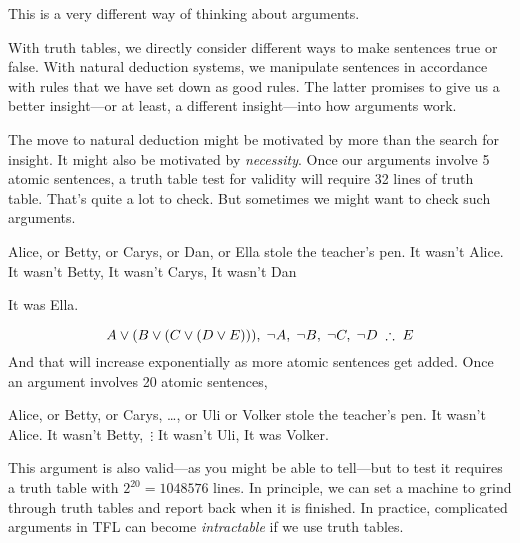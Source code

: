 {This is a very different way of thinking about arguments.}

With truth tables, we directly consider different ways to make sentences true or false. With natural deduction systems, we manipulate sentences in accordance with rules that we have set down as good rules. The latter promises to give us a better insight---or at least, a different insight---into how arguments work.

The move to natural deduction might be motivated by more than the search for insight. It might also be motivated by \emph{necessity}. Once our arguments involve 5 atomic sentences,  a truth table test for validity will require 32 lines of truth table. That's quite a lot to check. But sometimes we might want to check such arguments.
\begin{center}
\begin{earg}
\prem Alice, or Betty, or Carys, or Dan, or Ella stole the teacher's pen.
\prem It wasn't Alice.
\prem It wasn't Betty,
\prem It wasn't Carys,
\prem It wasn't Dan
\item [\therefore] It was Ella.
\end{earg}
\end{center}
$$A\eor(B\eor (C\eor (D\eor E))),\;\enot A,\;\enot B,\;\enot C,\;\enot D\;\therefore\;E$$
And that will increase exponentially as more atomic sentences get added. Once an argument involves 20 atomic sentences,
\begin{center}
\begin{earg}
\prem Alice, or Betty, or Carys, \ldots, or Uli or Volker stole the teacher's pen.
\prem It wasn't Alice.
\prem It wasn't Betty,
\prem\,$\vdots$
\prem It wasn't Uli,
\conc It was Volker.
\end{earg}
\end{center}
This argument is also valid---as you might be able to tell---but to test it requires a truth table with $2^{20} = 1048576$ lines. In principle, we can set a machine to grind through truth tables and report back when it is finished. In practice, complicated arguments in TFL can become \emph{intractable} if we use truth tables.


